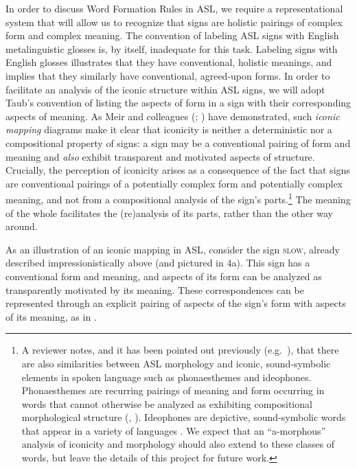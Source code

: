 \documentclass[output=paper,
modfonts
]{LSP/langsci}
\begin{document}
  In order to discuss Word Formation Rules in ASL, we require a representational system that will allow us to recognize that signs are holistic pairings of complex form and complex meaning. The convention of labeling ASL signs with English metalinguistic glosses is, by itself, inadequate for this task. Labeling signs with English glosses illustrates that they have conventional, holistic meanings, and implies that they similarly have conventional, agreed-upon forms. In order to facilitate an analysis of the iconic structure within ASL signs, we will adopt Taub's \citeyearpar{Taub2001} convention of listing the aspects of form in a sign with their corresponding aspects of meaning. As Meir and colleagues (\citealt[874]{Meir2010}; \citealt[316]{Meir2013}) have demonstrated, such \textit{iconic mapping} diagrams make it clear that iconicity is neither a deterministic nor a compositional property of signs: a sign may be a conventional pairing of form and meaning and \textit{also} exhibit transparent and motivated aspects of structure. Crucially, the perception of iconicity arises as a consequence of the fact that signs are conventional pairings of a potentially complex form and potentially complex meaning, and not from a compositional analysis of the sign's parts.\footnote{A reviewer notes, and it has been pointed out previously (e.g.\ \citealt{Fernald2000}), that there are also similarities between ASL morphology and iconic, sound-symbolic elements in spoken language such as phonaesthemes and ideophones. Phonaesthemes are recurring pairings of meaning and form occurring in words that cannot otherwise be analyzed as exhibiting compositional morphological structure (\citealt[49]{anderson1992}, \citealt{Bergen2004}). Ideophones are depictive, sound-symbolic words that appear in a variety of languages \citep{Dingemanse2012}. We expect that an ``a-morphous'' analysis of iconicity and morphology should also extend to these classes of words, but leave the details of this project for future work.} The meaning of the whole facilitates the (re)analysis of its parts, rather than the other way around.

As an illustration of an iconic mapping in ASL, consider the sign \textsc{slow}, already described impressionistically above (and pictured in 4a). This sign has a conventional form and meaning, and aspects of its form can be analyzed as transparently motivated by its meaning. These correspondences can be represented through an explicit pairing of aspects of the sign's form with aspects of its meaning, as in .
\end{document}
